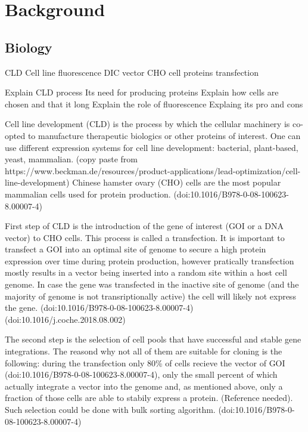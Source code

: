 \section{Background}
\subsection{Biology}
CLD
Cell line
fluorescence
DIC
vector
CHO cell
proteins
transfection

Explain CLD process
Its need for producing proteins
Explain how cells are chosen and that it long
Explain the role of fluorescence
Explaing its pro and cons

Cell line development (CLD) is the process by which the cellular machinery is co-opted to manufacture therapeutic biologics or other proteins of interest. One can use different expression systems for cell line development: bacterial, plant-based, yeast, mammalian. (copy paste from https://www.beckman.de/resources/product-applications/lead-optimization/cell-line-development) Chinese hamster ovary (CHO) cells are the most popular mammalian cells used for protein production. (doi:10.1016/B978-0-08-100623-8.00007-4) 

First step of CLD is the
introduction of the gene of interest (GOI or a DNA vector) to CHO cells. This process is called a transfection. It is important to transfect a GOI into an optimal site of genome to secure a high protein expression over time during protein production, however pratically transfection mostly results in a vector being inserted into a random site within a host cell genome. In case the gene was transfected in the inactive site of genome (and the majority of genome is not transriptionally active) the cell will likely not express the gene. (doi:10.1016/B978-0-08-100623-8.00007-4) (doi:10.1016/j.coche.2018.08.002)

The second step is the selection of cell pools that have successful and stable gene integrations. The reasond why not all of them are suitable for cloning is the following: during the transfection only 80\% of cells recieve the vector of GOI (doi:10.1016/B978-0-08-100623-8.00007-4), only the small percent of which actually integrate a vector into the genome and, as mentioned above, only a fraction of those cells are able to stabily express a protein. (Reference needed). Such selection could be done with bulk sorting algorithm. (doi:10.1016/B978-0-08-100623-8.00007-4)

